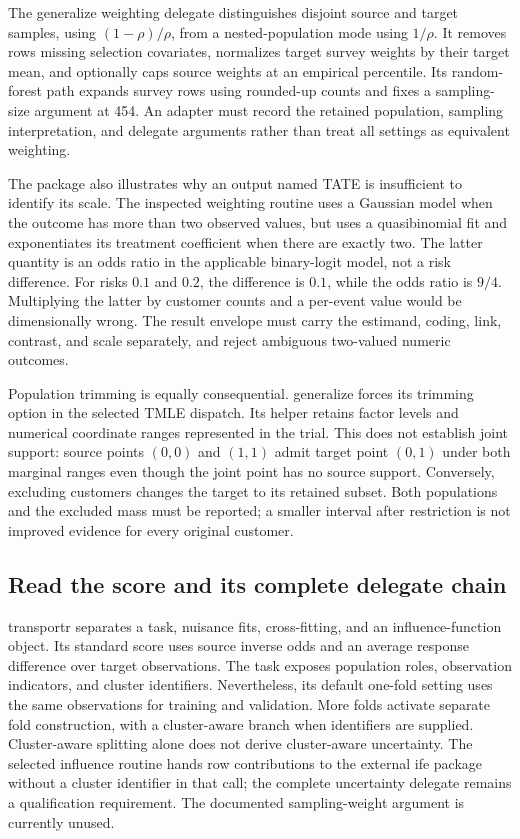 The generalize weighting delegate distinguishes disjoint source and target samples, using $(1-\rho)/\rho$, from a nested-population mode using $1/\rho$. It removes rows missing selection covariates, normalizes target survey weights by their target mean, and optionally caps source weights at an empirical percentile. Its random-forest path expands survey rows using rounded-up counts and fixes a sampling-size argument at 454. An adapter must record the retained population, sampling interpretation, and delegate arguments rather than treat all settings as equivalent weighting.~\citep{exec25_rtm_generalize}

The package also illustrates why an output named TATE is insufficient to identify its scale. The inspected weighting routine uses a Gaussian model when the outcome has more than two observed values, but uses a quasibinomial fit and exponentiates its treatment coefficient when there are exactly two. The latter quantity is an odds ratio in the applicable binary-logit model, not a risk difference. For risks $0.1$ and $0.2$, the difference is $0.1$, while the odds ratio is $9/4$. Multiplying the latter by customer counts and a per-event value would be dimensionally wrong. The result envelope must carry the estimand, coding, link, contrast, and scale separately, and reject ambiguous two-valued numeric outcomes.~\citep{exec25_rtm_generalize,exec25_rtm_choice}

Population trimming is equally consequential. generalize forces its trimming option in the selected TMLE dispatch. Its helper retains factor levels and numerical coordinate ranges represented in the trial. This does not establish joint support: source points $(0,0)$ and $(1,1)$ admit target point $(0,1)$ under both marginal ranges even though the joint point has no source support. Conversely, excluding customers changes the target to its retained subset. Both populations and the excluded mass must be reported; a smaller interval after restriction is not improved evidence for every original customer.~\citep{exec25_rtm_generalize,exec25_rtm_choice}

\subsection{Read the score and its complete delegate chain}

transportr separates a task, nuisance fits, cross-fitting, and an influence-function object. Its standard score uses source inverse odds and an average response difference over target observations. The task exposes population roles, observation indicators, and cluster identifiers. Nevertheless, its default one-fold setting uses the same observations for training and validation. More folds activate separate fold construction, with a cluster-aware branch when identifiers are supplied. Cluster-aware splitting alone does not derive cluster-aware uncertainty. The selected influence routine hands row contributions to the external ife package without a cluster identifier in that call; the complete uncertainty delegate remains a qualification requirement. The documented sampling-weight argument is currently unused.~\citep{exec25_rtm_transportr}

